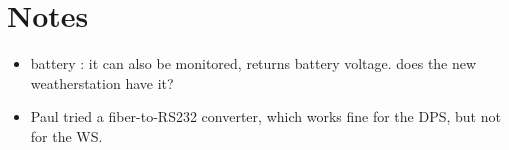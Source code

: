 \documentclass[11pt]{article}
\begin{document}
\section{Notes}
\begin{itemize}



\item battery : it can also be monitored, returns battery voltage. does the new weatherstation have it?









\item 
Paul tried a fiber-to-RS232 converter, which works fine for the DPS, but not for
the WS.

\end{itemize}

%
%
\end{document}
